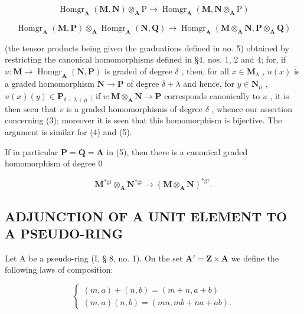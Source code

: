 \[
\operatorname{Homgr} _ {\mathbf {A}} (\mathbf {M}, \mathbf {N}) \otimes_ {\mathbf {A}} \mathrm{P} \rightarrow \operatorname{Homgr} _ {\mathbf {A}} (\mathbf {M}, \mathbf {N} \otimes_ {\mathbf {A}} \mathrm{P})
\]

\[
\operatorname{Homgr} _ {\mathbf {A}} (\mathbf {M}, \mathbf {P}) \otimes_ {\mathbf {A}} \operatorname{Homgr} _ {\mathbf {A}} (\mathbf {N}, \mathbf {Q}) \rightarrow \operatorname{Homgr} _ {\mathbf {A}} (\mathbf {M} \otimes_ {\mathbf {A}} \mathbf {N}, \mathbf {P} \otimes_ {\mathbf {A}} \mathbf {Q}) \tag {5}
\]

(the tensor products being given the graduations defined in no. 5) obtained by restricting the canonical homomorphisms defined in §4, nos. 1, 2 and 4; for, if \(u: \mathbf{M} \to \operatorname{Homgr}_{\mathbf{A}}(\mathbf{N}, \mathbf{P})\) is graded of degree \(\delta\) , then, for all \(x \in \mathbf{M}_{\lambda}\) , \(u(x)\) is a graded homomorphism \(\mathbf{N} \to \mathbf{P}\) of degree \(\delta + \lambda\) and hence, for \(y \in \mathbf{N}_{\mu}\) , \(u(x)(y) \in \mathbf{P}_{\delta + \lambda + \mu}\) ; if \(v: \mathbf{M} \otimes_{\mathbf{A}} \mathbf{N} \to \mathbf{P}\) corresponds canonically to \(u\) , it is then seen that \(v\) is a graded homomorphisms of degree \(\delta\) , whence our assertion concerning (3); moreover it is seen that this homomorphism is bijective. The argument is similar for (4) and (5).

If in particular \(\mathbf{P} = \mathbf{Q} = \mathbf{A}\) in (5), then there is a canonical graded homomorphism of degree 0

\[
\mathbf {M} ^ {* \mathrm{gr}} \otimes_ {\mathbf {A}} \mathbf {N} ^ {* \mathrm{gr}} \rightarrow (\mathbf {M} \otimes_ {\mathbf {A}} \mathbf {N}) ^ {* \mathrm{gr}}.\tag{6}
\]


\subsection{ADJUNCTION OF A UNIT ELEMENT TO A PSEUDO-RING}

Let A be a pseudo-ring (I, § 8, no. 1). On the set \(\mathbf{A}' = \mathbf{Z} \times \mathbf{A}\) we define the following laws of composition:

\[
\left\{ \begin{array}{l} (m, a) + (n, b) = (m + n, a + b) \\ (m, a) (n, b) = (m n, m b + n a + a b). \end{array} \right.\tag{1}
\]


